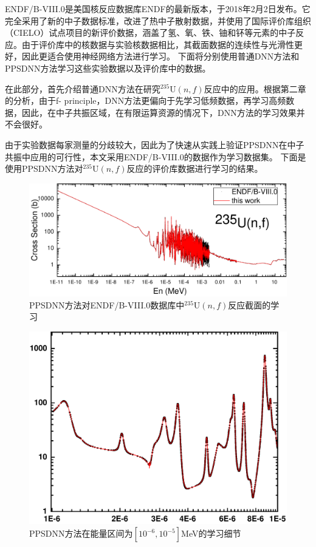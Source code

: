 ENDF/B-VIII.0是美国核反应数据库ENDF的最新版本，于2018年2月2日发布\cite{Brown2018}。它完全采用了新的中子数据标准，改进了热中子散射数据，并使用了国际评价库组织（CIELO）试点项目的新评价数据，涵盖了氢、氧、铁、铀和钚等元素的中子反应\cite{Sobes2021}。由于评价库中的核数据与实验核数据相比，其截面数据的连续性与光滑性更好，因此更适合使用神经网络方法进行学习。
下面将分别使用普通DNN方法和PPSDNN方法学习这些实验数据以及评价库中的数据。



在此部分，首先介绍普通DNN方法在研究$^{235}\text{U}(n,f)$反应中的应用。根据第二章的分析，由于f- principle，DNN方法更偏向于先学习低频数据，再学习高频数据，因此，在中子共振区域，在有限运算资源的情况下，DNN方法的学习效果并不会很好。

由于实验数据每家测量的分歧较大，因此为了快速从实践上验证PPSDNN在中子共振中应用的可行性，本文采用ENDF/B-VIII.0的数据作为学习数据集。
下面是使用PPSDNN方法对$^{235}\text{U}(n,f)$反应的评价库数据进行学习的结果。
\begin{figure}[htbp!]
  \centering
  \includegraphics[width=0.94\linewidth]{figures/endftrain/endftrain.pdf}
  \caption{PPSDNN方法对ENDF/B-VIII.0数据库中$^{235}\text{U}(n,f)$反应截面的学习}
  \label{endftrain}
\end{figure}
\begin{figure}[htbp!]
  \centering
  \includegraphics[width=0.84\linewidth]{figures/endftrain/G6.pdf}
  \caption{PPSDNN方法在能量区间为$[10^{-6},10^{-5}]$MeV的学习细节}
  \label{endf6}
\end{figure}
